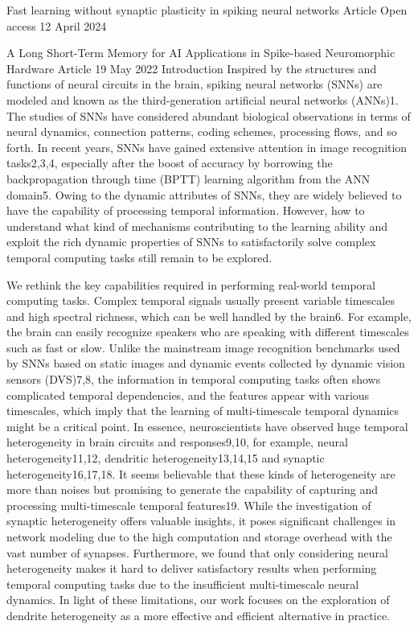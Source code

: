 Fast learning without synaptic plasticity in spiking neural networks
Article Open access 12 April 2024

A Long Short-Term Memory for AI Applications in Spike-based Neuromorphic Hardware
Article 19 May 2022
Introduction
Inspired by the structures and functions of neural circuits in the brain, spiking neural networks (SNNs) are modeled and known as the third-generation artificial neural networks (ANNs)1. The studies of SNNs have considered abundant biological observations in terms of neural dynamics, connection patterns, coding schemes, processing flows, and so forth. In recent years, SNNs have gained extensive attention in image recognition tasks2,3,4, especially after the boost of accuracy by borrowing the backpropagation through time (BPTT) learning algorithm from the ANN domain5. Owing to the dynamic attributes of SNNs, they are widely believed to have the capability of processing temporal information. However, how to understand what kind of mechanisms contributing to the learning ability and exploit the rich dynamic properties of SNNs to satisfactorily solve complex temporal computing tasks still remain to be explored.

We rethink the key capabilities required in performing real-world temporal computing tasks. Complex temporal signals usually present variable timescales and high spectral richness, which can be well handled by the brain6. For example, the brain can easily recognize speakers who are speaking with different timescales such as fast or slow. Unlike the mainstream image recognition benchmarks used by SNNs based on static images and dynamic events collected by dynamic vision sensors (DVS)7,8, the information in temporal computing tasks often shows complicated temporal dependencies, and the features appear with various timescales, which imply that the learning of multi-timescale temporal dynamics might be a critical point. In essence, neuroscientists have observed huge temporal heterogeneity in brain circuits and responses9,10, for example, neural heterogeneity11,12, dendritic heterogeneity13,14,15 and synaptic heterogeneity16,17,18. It seems believable that these kinds of heterogeneity are more than noises but promising to generate the capability of capturing and processing multi-timescale temporal features19. While the investigation of synaptic heterogeneity offers valuable insights, it poses significant challenges in network modeling due to the high computation and storage overhead with the vast number of synapses. Furthermore, we found that only considering neural heterogeneity makes it hard to deliver satisfactory results when performing temporal computing tasks due to the insufficient multi-timescale neural dynamics. In light of these limitations, our work focuses on the exploration of dendrite heterogeneity as a more effective and efficient alternative in practice.

